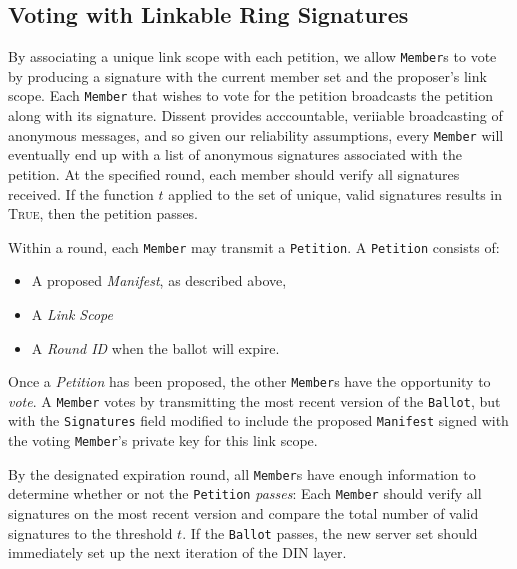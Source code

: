 
\subsection{Voting with Linkable Ring Signatures}
By associating a unique link scope with each petition, we allow \texttt{Member}s
to vote by producing a signature with the current member set and the proposer's
link scope. Each \texttt{Member} that wishes to vote for the petition broadcasts
the petition along with its signature. Dissent provides acccountable, veriiable
broadcasting of anonymous messages, and so given our reliability assumptions,
every \texttt{Member} will eventually end up with a list of anonymous signatures
associated with the petition. At the specified round, each member should verify
all signatures received. If the function $t$ applied to the set of unique, valid
signatures results in \textsc{True}, then the petition passes.

Within a round, each \texttt{Member} may  transmit a \texttt{Petition}. A
\texttt{Petition} consists of:
\begin{itemize}
  \item A proposed \emph{Manifest}, as described above,
  \item A \emph{Link Scope}
  \item A \emph{Round ID} when the ballot will expire.
\end{itemize}

Once a \emph{Petition} has been proposed, the other \texttt{Member}s have the
opportunity to \emph{vote}. A \texttt{Member} votes by transmitting the most
recent version of the \texttt{Ballot}, but with the \texttt{Signatures} field
modified to include the proposed \texttt{Manifest} signed with the voting
\texttt{Member}'s private key for this link scope.

By the designated expiration round, all \texttt{Member}s have enough
information to determine whether or not the \texttt{Petition} \emph{passes}:
Each \texttt{Member} should verify all signatures on the most recent
version
and compare the total number of valid signatures to the threshold $t$. If the
\texttt{Ballot} passes, the new server set should immediately set up the
next iteration of the DIN layer.

